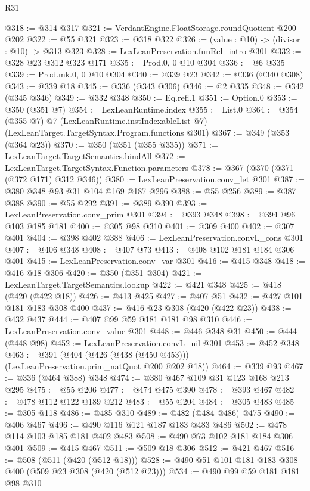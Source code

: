 \begin{lexlean}{R31}
\begin{coremodule}
@318 := @314 @317
@321 := VerdantEngine.FloatStorage.roundQuotient @200 @202
@322 := @55 @321
@323 := @318 @322
@326 := (value : @10) -> (divisor : @10) -> @313 @323
@328 := LexLeanPreservation.funRel_intro @301
@332 := @328 @23 @312 @323 @171
@335 := Prod.{0, 0} @10 @304
@336 := @6 @335
@339 := Prod.mk.{0, 0} @10 @304
@340 := @339 @23
@342 := @336 (@340 @308)
@343 := @339 @18
@345 := @336 (@343 @306)
@346 := @2 @335
@348 := @342 (@345 @346)
@349 := @332 @348
@350 := Eq.refl.{1}
@351 := Option.{0}
@353 := @350 (@351 @7)
@354 := LexLeanRuntime.index
@355 := List.{0}
@364 := @354
    (@355 @7)
    @7
    (LexLeanRuntime.instIndexableList @7)
    (LexLeanTarget.TargetSyntax.Program.functions @301)
@367 := @349 (@353 (@364 @23))
@370 := @350 (@351 (@355 @335))
@371 := LexLeanTarget.TargetSemantics.bindAll
@372 := LexLeanTarget.TargetSyntax.Function.parameters
@378 := @367 (@370 (@371 (@372 @171) @312 @346))
@380 := LexLeanPreservation.conv_let @301
@387 := @380 @348 @93 @31 @104 @169 @187 @296
@388 := @55 @256
@389 := @387 @388
@390 := @55 @292
@391 := @389 @390
@393 := LexLeanPreservation.conv_prim @301
@394 := @393 @348
@398 := @394 @96 @103 @185 @181
@400 := @305 @98 @310
@401 := @309 @400
@402 := @307 @401
@404 := @398 @402 @388
@406 := LexLeanPreservation.convL_cons @301
@407 := @406 @348
@408 := @407 @73
@413 := @408 @102 @181 @184 @306 @401
@415 := LexLeanPreservation.conv_var @301
@416 := @415 @348
@418 := @416 @18 @306
@420 := @350 (@351 @304)
@421 := LexLeanTarget.TargetSemantics.lookup
@422 := @421 @348
@425 := @418 (@420 (@422 @18))
@426 := @413 @425
@427 := @407 @51
@432 := @427 @101 @181 @183 @308 @400
@437 := @416 @23 @308 (@420 (@422 @23))
@438 := @432 @437
@444 := @407 @99 @59 @181 @181 @98 @310
@446 := LexLeanPreservation.conv_value @301
@448 := @446 @348 @31
@450 := @444 (@448 @98)
@452 := LexLeanPreservation.convL_nil @301
@453 := @452 @348
@463 := @391 (@404 (@426 (@438 (@450 @453))) (LexLeanPreservation.prim_natQuot @200 @202 @18))
@464 := @339 @93
@467 := @336 (@464 @388) @348
@474 := @380 @467 @109 @31 @123 @168 @213 @295
@475 := @55 @206
@477 := @474 @475 @390
@478 := @393 @467
@482 := @478 @112 @122 @189 @212
@483 := @55 @204
@484 := @305 @483
@485 := @305 @118
@486 := @485 @310
@489 := @482 (@484 @486) @475
@490 := @406 @467
@496 := @490 @116 @121 @187 @183 @483 @486
@502 := @478 @114 @103 @185 @181 @402 @483
@508 := @490 @73 @102 @181 @184 @306 @401
@509 := @415 @467
@511 := @509 @18 @306
@512 := @421 @467
@516 := @508 (@511 (@420 (@512 @18)))
@528 := @490 @51 @101 @181 @183 @308 @400 (@509 @23 @308 (@420 (@512 @23)))
@534 := @490 @99 @59 @181 @181 @98 @310

\end{coremodule}
\end{lexlean}
